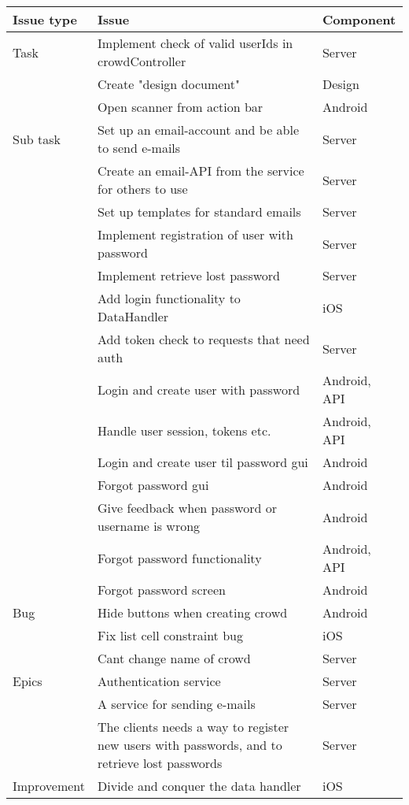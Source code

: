 \begin{longtable}{|L{2cm}|L{10cm}|L{3cm}|}
\hline
\textbf{Issue type} & \textbf{Issue} & \textbf{Component} \\
\hline
Task & Implement check of valid userIds in crowdController & Server \\
\hline
 & Create "design document" & Design \\
 \hline
 & Open scanner from action bar & Android \\
 \hline
Sub task & Set up an email-account and be able to send e-mails & Server \\
\hline
 & Create an email-API from the service for others to use & Server \\
 \hline
 & Set up templates for standard emails & Server \\
 \hline
 & Implement registration of user with password & Server \\
 \hline
 & Implement retrieve lost password & Server \\
 \hline
 & Add login functionality to DataHandler & iOS\\
 \hline
 & Add token check to requests that need auth & Server\\
 \hline
 & Login and create user with password & Android, API\\
 \hline
 & Handle user session, tokens etc. & Android, API\\
\hline
 & Login and create user til password gui & Android\\
\hline
 & Forgot password gui & Android\\
\hline
 & Give feedback when password or username is wrong & Android\\
\hline
 & Forgot password functionality &  Android, API\\
\hline
 & Forgot password screen & Android\\
\hline
 
Bug & Hide buttons when creating crowd & Android \\
\hline
 & Fix list cell constraint bug & iOS \\
\hline
 & Cant change name of crowd & Server \\
 \hline
 
Epics & Authentication service & Server \\
 \hline
 & A service for sending e-mails & Server \\
\hline
 & The clients needs a way to register new users with passwords, and to retrieve lost passwords & Server \\
\hline

Improvement & Divide and conquer the data handler & iOS \\
\hline
\end{longtable}
